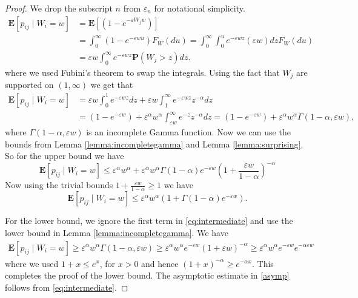 \documentclass[10pt,a4paper]{amsart}
\newcommand{\E}{\mathbf{E}}
\newcommand{\eps}{\varepsilon}
\newcommand{\prob}{\mathbf{P}}
\begin{document}
\begin{proof}
We drop the subscript $n$ from $\eps_n$ for notational simplicity.
\begin{align*}
    \E[ p_{ij}\mid W_i=w]&=  \E\left[ \left(1-e^{-\eps W_j w}\right)\right]\\
    &= \int_0^\infty (1-e^{-\eps w u}) F_W(du)= \int_0^\infty \int_0^u e^{-\eps w z} (\eps w) dz F_W(du)\\
    &= \eps w \int_0^\infty e^{-\eps w z}\prob(W_j>z) dz.
\end{align*}
where we used Fubini's theorem to swap the integrals. Using the fact that $W_j$ are supported on $(1,\infty)$ we get that
\begin{align}
    \E[ p_{ij}\mid W_i=w]&=\eps w \int_0^1 e^{-\eps w z} dz+  \eps w\int_1^\infty e^{-\eps w z}z^{-\alpha} dz\nonumber\\
    &=(1-e^{-\eps w})+  \eps^\alpha w^\alpha \int_{\eps w}^\infty e^{-z}z^{-\alpha} dz=  (1-e^{-\eps w}) + \eps^\alpha w^\alpha \Gamma(1-\alpha, \eps w), \label{eq:intermediate}
\end{align}
where $\Gamma(1-\alpha, \eps w)$ is an incomplete Gamma function. Now we can use the bounds from Lemma \ref{lemma:incompletegamma} and Lemma \ref{lemma:surprising}. So for the upper bound we have
$$ \E[ p_{ij}\mid W_i=w]\le \eps^{\alpha}w^{\alpha}+ \eps^\alpha w^\alpha \Gamma(1-\alpha) e^{-\eps w}\left( 1+ \frac{\eps w}{1-\alpha}\right)^{-\alpha}$$
Now using the trivial bounds  $1+ \frac{\eps w}{1-\alpha}\ge 1$ we have
$$\E[ p_{ij}\mid W_i=w]\le \eps^{\alpha} w^{\alpha}(1+\Gamma(1-\alpha) e^{-\eps w}).$$

For the lower bound, we ignore the first term in \eqref{eq:intermediate} and use the lower bound in Lemma \ref{lemma:incompletegamma}. We have 
\begin{align*}
  \E[ p_{ij}\mid W_i=w]\ge \eps^\alpha w^{\alpha}\Gamma(1-\alpha, \eps w)
  \ge \eps^{\alpha} w^\alpha e^{-\eps w}(1+\eps w)^{-\alpha}\ge \eps^{\alpha}  w^{\alpha} e^{-\eps w}e^{-\alpha \eps w}
\end{align*}
where we used $1+x\le e^x$, for $x>0$ and hence $(1+x)^{-\alpha}\ge e^{-\alpha x}$. This completes the proof of the lower bound. The asymptotic estimate in \eqref{asymp} follows from \eqref{eq:intermediate}.
\end{proof}
\end{document}
